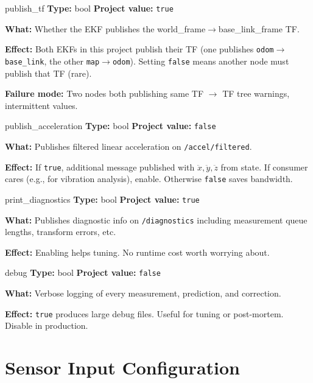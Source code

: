 \documentclass[11pt,a4paper]{article}
\begin{document}
\begin{paramcard}{publish\_tf}
\textbf{Type:} bool \quad \textbf{Project value:} \texttt{true}

\textbf{What:} Whether the EKF publishes the world\_frame$\to$base\_link\_frame TF.

\textbf{Effect:} Both EKFs in this project publish their TF (one publishes \texttt{odom}$\to$\texttt{base\_link}, the other \texttt{map}$\to$\texttt{odom}). Setting \texttt{false} means another node must publish that TF (rare).

\textbf{Failure mode:} Two nodes both publishing same TF $\to$ TF tree warnings, intermittent values.
\end{paramcard}

\begin{paramcard}{publish\_acceleration}
\textbf{Type:} bool \quad \textbf{Project value:} \texttt{false}

\textbf{What:} Publishes filtered linear acceleration on \texttt{/accel/filtered}.

\textbf{Effect:} If \texttt{true}, additional message published with $\ddot{x}, \ddot{y}, \ddot{z}$ from state. If consumer cares (e.g., for vibration analysis), enable. Otherwise \texttt{false} saves bandwidth.
\end{paramcard}

\begin{paramcard}{print\_diagnostics}
\textbf{Type:} bool \quad \textbf{Project value:} \texttt{true}

\textbf{What:} Publishes diagnostic info on \texttt{/diagnostics} including measurement queue lengths, transform errors, etc.

\textbf{Effect:} Enabling helps tuning. No runtime cost worth worrying about.
\end{paramcard}

\begin{paramcard}{debug}
\textbf{Type:} bool \quad \textbf{Project value:} \texttt{false}

\textbf{What:} Verbose logging of every measurement, prediction, and correction.

\textbf{Effect:} \texttt{true} produces large debug files. Useful for tuning or post-mortem. Disable in production.
\end{paramcard}

\section{Sensor Input Configuration}
\end{document}
